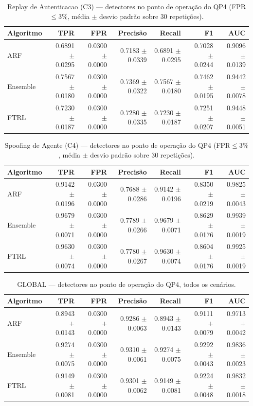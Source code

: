 \begin{table}[htbp]
\centering
\caption{Replay de Autenticacao (C3) — detectores no ponto de operação do QP4 (FPR$\le 3\%$, média $\pm$ desvio padrão sobre 30 repetições).}
\label{tab:8-3}
\begin{tabular}{lrrrrrr}
\toprule
Algoritmo & TPR & FPR & Precis\~ao & Recall & F1 & AUC \\
\midrule
ARF & 0.6891 $\pm$ 0.0295 & 0.0300 $\pm$ 0.0000 & 0.7183 $\pm$ 0.0339 & 0.6891 $\pm$ 0.0295 & 0.7028 $\pm$ 0.0244 & 0.9096 $\pm$ 0.0139 \\
Ensemble & 0.7567 $\pm$ 0.0180 & 0.0300 $\pm$ 0.0000 & 0.7369 $\pm$ 0.0322 & 0.7567 $\pm$ 0.0180 & 0.7462 $\pm$ 0.0195 & 0.9442 $\pm$ 0.0078 \\
FTRL & 0.7230 $\pm$ 0.0187 & 0.0300 $\pm$ 0.0000 & 0.7280 $\pm$ 0.0335 & 0.7230 $\pm$ 0.0187 & 0.7251 $\pm$ 0.0207 & 0.9448 $\pm$ 0.0051 \\
\bottomrule
\end{tabular}
\end{table}

\begin{table}[htbp]
\centering
\caption{Spoofing de Agente (C4) — detectores no ponto de operação do QP4 (FPR$\le 3\%$, média $\pm$ desvio padrão sobre 30 repetições).}
\label{tab:8-4}
\begin{tabular}{lrrrrrr}
\toprule
Algoritmo & TPR & FPR & Precis\~ao & Recall & F1 & AUC \\
\midrule
ARF & 0.9142 $\pm$ 0.0196 & 0.0300 $\pm$ 0.0000 & 0.7688 $\pm$ 0.0286 & 0.9142 $\pm$ 0.0196 & 0.8350 $\pm$ 0.0219 & 0.9825 $\pm$ 0.0043 \\
Ensemble & 0.9679 $\pm$ 0.0071 & 0.0300 $\pm$ 0.0000 & 0.7789 $\pm$ 0.0266 & 0.9679 $\pm$ 0.0071 & 0.8629 $\pm$ 0.0176 & 0.9939 $\pm$ 0.0019 \\
FTRL & 0.9630 $\pm$ 0.0074 & 0.0300 $\pm$ 0.0000 & 0.7780 $\pm$ 0.0267 & 0.9630 $\pm$ 0.0074 & 0.8604 $\pm$ 0.0176 & 0.9925 $\pm$ 0.0019 \\
\bottomrule
\end{tabular}
\end{table}

\begin{table}[htbp]
\centering
\caption{GLOBAL — detectores no ponto de operação do QP4, todos os cenários.}
\label{tab:8-global}
\begin{tabular}{lrrrrrr}
\toprule
Algoritmo & TPR & FPR & Precis\~ao & Recall & F1 & AUC \\
\midrule
ARF & 0.8943 $\pm$ 0.0143 & 0.0300 $\pm$ 0.0000 & 0.9286 $\pm$ 0.0063 & 0.8943 $\pm$ 0.0143 & 0.9111 $\pm$ 0.0079 & 0.9713 $\pm$ 0.0042 \\
Ensemble & 0.9274 $\pm$ 0.0075 & 0.0300 $\pm$ 0.0000 & 0.9310 $\pm$ 0.0061 & 0.9274 $\pm$ 0.0075 & 0.9292 $\pm$ 0.0043 & 0.9836 $\pm$ 0.0023 \\
FTRL & 0.9149 $\pm$ 0.0081 & 0.0300 $\pm$ 0.0000 & 0.9301 $\pm$ 0.0062 & 0.9149 $\pm$ 0.0081 & 0.9224 $\pm$ 0.0048 & 0.9832 $\pm$ 0.0018 \\
\bottomrule
\end{tabular}
\end{table}

